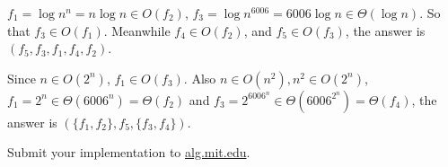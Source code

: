 \documentclass[12pt,twoside]{article}
\begin{document}


\begin{problems}

\problem  %

\begin{problemparts}
  \problempart %
  $f_1 = \log{n^n} = n\log{n} \in O(f_2)$,
  $f_3 = \log{n^{6006}} = 6006\log{n} \in \Theta(\log{n})$. So that
  $f_3 \in O(f_1)$. Meanwhile $f_4 \in O(f_2)$, and $f_5 \in O(f_3)$, the
  answer is $(f_5, f_3, f_1, f_4, f_2)$.

  \problempart %
  Since $n \in O(2^n)$, $f_1 \in O(f_3)$. Also
  $n \in O(n^2), n^2 \in O(2^n)$,
  $f_1 = 2^n \in \Theta(6006^n) = \Theta(f_2)$ and
  $f_3 = 2^{6006^n} \in \Theta(6006^{2^n}) = \Theta(f_4)$, the answer is
  $(\{f_1, f_2\}, f_5, \{f_3, f_4\})$.
  
  \problempart %
  \problempart %
\end{problemparts}

\newpage
\problem  %

\begin{problemparts}
\problempart %
\problempart %
\end{problemparts}

\newpage
\problem  %

\newpage
\problem  %

\begin{problemparts}
\problempart %
\problempart %
\problempart %
\problempart Submit your implementation to {\small\url{alg.mit.edu}}.
\end{problemparts}

\end{problems}
\end{document}

